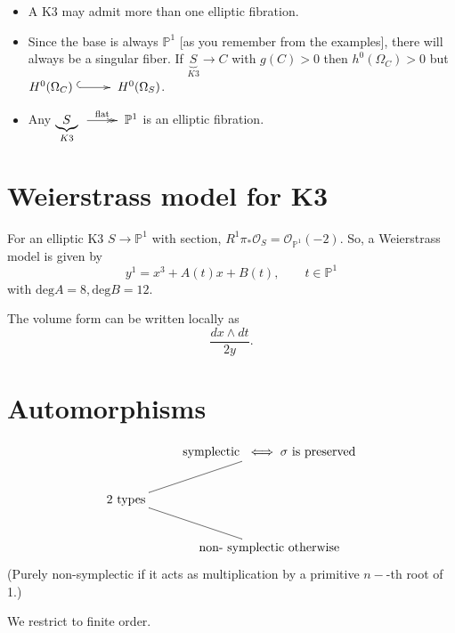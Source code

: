 \begin{remark}
\label{remark-elliptic-k3}
\begin{itemize}
\item A K3 may admit more than one elliptic
fibration.

\item Since the base is always $\mathbb{P}^1$
[as you remember from the examples],
there will always be a singular fiber.
If $\underbrace{S}_{K3} \to C$ with $g(C) >
0$
then  $h^0(\Omega_C)>0$
but $H^0(\Omega_C)
\xymatrix{\ar@{^{(}->}[r]&} H^0(\Omega_S)$.

\item Any
$\underbrace{S}_{K3}
\xymatrix{\ar@{->>}[r]^{\text{flat}}&}
\mathbb{P}^1$
is an elliptic fibration.
\end{itemize}
\end{remark}

\section{Weierstrass model for K3}
\label{section-weierstrass-model-k3}

\noindent
For an elliptic K3 $S \to \mathbb{P}^1$ with
section,
$R^1\pi_*\mathcal{O}_S =
\mathcal{O}_{\mathbb{P}^1}(-2)$.
So, a Weierstrass model is given by
$$
y^1=x^3 + A(t)x + B(t),\qquad t \in
\mathbb{P}^1
$$
with $\text{deg}A=8,\text{deg}B=12$.

\medskip\noindent
The volume form can be written locally as
$$
\frac{dx\wedge dt}{2y}.
$$
\section{Automorphisms}
\label{section-automorphisms}


$$
\xymatrix{
&  \text{symplectic }\iff \sigma \text{ is
preserved}\\
\text{2 types}\ar@{-}[ur]\ar@{-}[dr]\\
&  \text{non- symplectic otherwise}
}
$$
(Purely non-symplectic if it acts as
multiplication by a
primitive $n-$-th root of 1.)

\noindent
We restrict to finite order.


